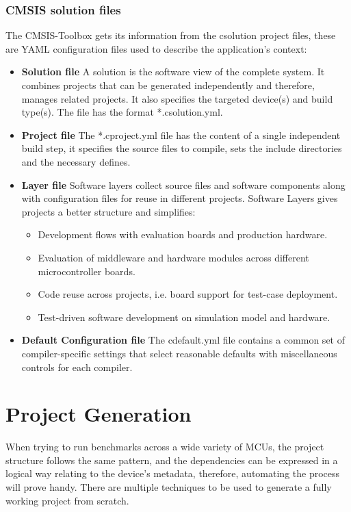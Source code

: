\subsubsection{CMSIS solution files}
The CMSIS-Toolbox gets its information from the csolution project files, these are YAML configuration files used to describe the application's context:
\begin{itemize}
	\item \textbf{Solution file} A solution is the software view of the complete system. It combines projects that can be generated independently and therefore, manages related projects. It also specifies the targeted device(s) and build type(s). The file has the format *.csolution.yml.
	\item \textbf{Project file} The *.cproject.yml file has the content of a single independent build step, it specifies the source files to compile, sets the include directories and the necessary defines.
	\item \textbf{Layer file} Software layers collect source files and software components along with configuration files for reuse in different projects. Software Layers gives projects a better structure and simplifies:
	\begin{itemize}
		\item Development flows with evaluation boards and production hardware.
		\item Evaluation of middleware and hardware modules across different microcontroller boards.
		\item Code reuse across projects, i.e. board support for test-case deployment.
		\item Test-driven software development on simulation model and hardware.
	\end{itemize}
	\item \textbf{Default Configuration file} The cdefault.yml file contains a common set of compiler-specific settings that select reasonable defaults with miscellaneous controls for each compiler. 
\end{itemize}

\section{Project Generation}
When trying to run benchmarks across a wide variety of MCUs, the project structure follows the same pattern, and the dependencies can be expressed in a logical way relating to the device's metadata, therefore, automating the process will prove handy.
There are multiple techniques to be used to generate a fully working project from scratch.
